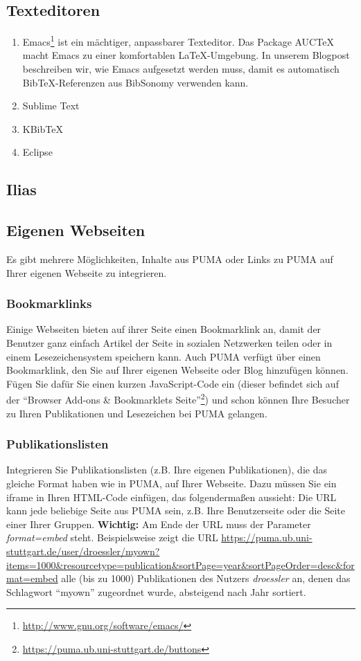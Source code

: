 \documentclass[a4paper,11pt,twoside]{scrbook}
\begin{document}
\subsection{Texteditoren}
\begin{enumerate}
    \item Emacs\footnote{\url{http://www.gnu.org/software/emacs/}} ist ein mächtiger, anpassbarer Texteditor. Das Package AUCTeX macht Emacs zu einer komfortablen LaTeX-Umgebung. In unserem Blogpost beschreiben wir, wie Emacs aufgesetzt werden muss, damit es automatisch BibTeX-Referenzen aus BibSonomy verwenden kann. 
    \item Sublime Text %
    \item KBibTeX
    \item Eclipse
\end{enumerate}
\subsection{Ilias}
\subsection{Eigenen Webseiten}
Es gibt mehrere Möglichkeiten, Inhalte aus PUMA oder Links zu PUMA auf Ihrer eigenen Webseite zu integrieren.

\subsubsection{Bookmarklinks}
Einige Webseiten bieten  auf ihrer Seite einen Bookmarklink an, damit der Benutzer ganz einfach Artikel der Seite in sozialen Netzwerken teilen oder in einem Lesezeichensystem speichern kann. 
\newline Auch PUMA verfügt über einen Bookmarklink, den Sie auf Ihrer eigenen Webseite oder Blog hinzufügen können. Fügen Sie dafür Sie einen kurzen JavaScript-Code ein (dieser befindet sich auf der \enquote{Browser Add-ons \& Bookmarklets Seite}\footnote{\url{https://puma.ub.uni-stuttgart.de/buttons}}) und schon können Ihre Besucher zu Ihren Publikationen und Lesezeichen bei PUMA gelangen.

\subsubsection{Publikationslisten}
Integrieren Sie Publikationslisten (z.B. Ihre eigenen Publikationen), die das gleiche Format haben wie in PUMA, auf Ihrer Webseite. Dazu müssen Sie ein iframe in Ihren HTML-Code einfügen, das folgendermaßen aussieht: %
\newline Die URL kann jede beliebige Seite aus PUMA sein, z.B. Ihre Benutzerseite oder die Seite einer Ihrer Gruppen. \textbf{Wichtig:} Am Ende der URL muss der Parameter \textit{format=embed} steht. Beispielsweise zeigt die URL \url{https://puma.ub.uni-stuttgart.de/user/droessler/myown?items=1000&resourcetype=publication&sortPage=year&sortPageOrder=desc&format=embed}
alle (bis zu 1000) Publikationen des Nutzers \textit{droessler} an, denen das Schlagwort \enquote{myown} zugeordnet wurde, absteigend nach Jahr sortiert.
\end{document}
